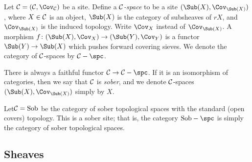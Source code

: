 \documentclass[10pt]{amsart}
\begin{document}



\begin{definition}

Let $\mcC=(\mcC,\Cov_\mcC)$ be a site.  Define a {\em $\mathcal{C}$-space} to be a site $(\Sub(X),\Cov_{\Sub(X)})$, where $X\in\mathcal{C}$ is an object, $\Sub(X)$ is the category of subsheaves of $rX$, and $\Cov_{\Sub(X)}$ is the induced topology.  Write $\Cov_X$ instead of $\Cov_{\Sub(X)}$.  A morphism $f\taking(\Sub(X),\Cov_X)\to(\Sub(Y),\Cov_Y)$ is a functor $\Sub(Y)\to\Sub(X)$ which pushes forward covering sieves.  We denote the category of $\mathcal{C}$-spaces by $\mcC-\spc$.

There is always a faithful functor $\mcC\to\mcC-\spc$.  If it is an isomorphism of categories, then we say that $\mathcal{C}$ is {\em sober}, and we denote $\mathcal{C}$-spaces $(\Sub(X),\Cov_{\Sub(X)})$ simply by $X$. 

\end{definition}

\begin{example}

Let$\mathcal{C}=\textnormal{Sob}$ be the category of sober topological spaces with the standard (open covers) topology.  This is a sober site; that is, the category $\tn{Sob}-\spc$ is simply the category of sober topological spaces.

\end{example}




\subsection{Sheaves}
\end{document}
